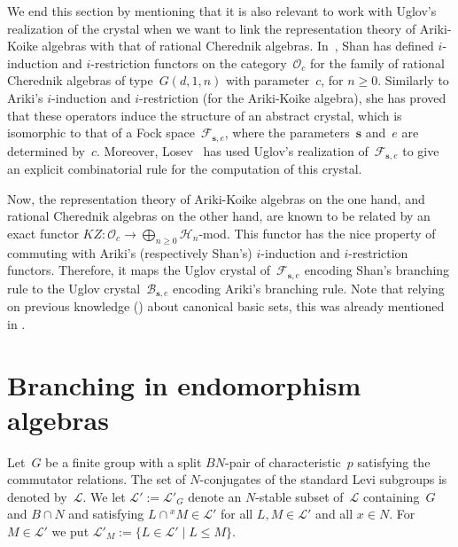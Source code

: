 \documentclass[twoside,12pt]{amsart}
\theoremstyle{plain}
\begin{document}
We end this section by mentioning that it is also relevant to work with Uglov's 
realization of the crystal when we want to link the representation theory of 
Ariki-Koike algebras with that of rational Cherednik algebras. 
In~\cite{Shan2008}, Shan has defined $i$-induction and $i$-restriction functors 
on the category~${\mathcal{O}}_c$ for the family of rational Cherednik algebras of 
type~$G(d,1,n)$ with parameter~$c$, for $n\geq0$. Similarly to Ariki's $i$-induction and 
$i$-restriction (for the Ariki-Koike algebra), she has proved that these 
operators induce the structure of an abstract crystal, which is isomorphic to 
that of a Fock space~${\mathcal{F}}_{{\mathbf{s}},e}$, where the parameters~${\mathbf{s}}$ and~$e$ are 
determined by~$c$. Moreover, Losev~\cite{Losev2013} has used Uglov's realization 
of~${\mathcal{F}}_{{\mathbf{s}},e}$ to give an explicit combinatorial rule for the computation of 
this crystal.

Now, the representation theory of Ariki-Koike algebras on the one hand, and 
rational Cherednik algebras on the other hand, are known to be related by an 
exact functor $KZ : {\mathcal{O}}_c {\longrightarrow} \bigoplus_{n \geq 0} {\mathcal{H}}_n$-mod. This functor 
has the nice property of 
commuting with Ariki's (respectively Shan's) $i$-induction and $i$-restriction 
functors. Therefore, it maps the Uglov crystal of~${\mathcal{F}}_{{\mathbf{s}},e}$ encoding Shan's 
branching rule to the Uglov crystal~${\mathcal{B}}_{{\mathbf{s}},e}$ encoding Ariki's branching 
rule. Note that relying on previous knowledge 
(\cite[Corollary 5.8]{ChlouverakiGordonGriffeth2011}) about canonical basic 
sets, this was already mentioned in \cite[Paragraph 4.15]{GordonMartino2013}.

\section{Branching in endomorphism algebras}
\label{BranchingEndomorphism}

Let~$G$ be a finite group with a split $BN$-pair of characteristic~$p$
satisfying the commutator relations. The set of $N$-conjugates of the 
standard Levi subgroups is denoted by~$\mathcal{L}$. We let $\mathcal{L'} :=
\mathcal{L'}_G$ denote an $N$-stable subset of~$\mathcal{L}$ containing~$G$
and $B \cap N$ and satisfying 
$L \cap {^x\!M} \in \mathcal{L}'$ for all $L, M \in \mathcal{L'}$ and all 
$x \in N$. For $M \in \mathcal{L'}$ we put $\mathcal{L'}_M := \{ L \in 
\mathcal{L'} \mid L \leq M \}$.
\end{document}
